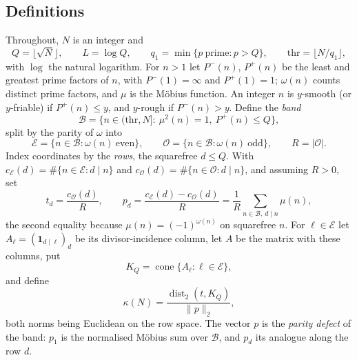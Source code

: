 \documentclass[11pt,a4paper]{article}
\theoremstyle{plain}
\theoremstyle{definition}
\theoremstyle{remark}
\DeclareMathOperator{\dist}{dist}
\DeclareMathOperator{\cone}{cone}
\newcommand{\Pp}{P^{+}}
\newcommand{\Pm}{P^{-}}
\newcommand{\thr}{\mathrm{thr}}
\newcommand{\vB}{\mathcal{E}}
\newcommand{\vR}{\mathcal{O}}
\newcommand{\band}{\mathcal{B}}
\begin{document}
\subsection{Definitions}\label{sec:object}
Throughout, $N$ is an integer and
\begin{equation}\label{eq:param}
  Q=\lfloor\sqrt N\rfloor,\qquad L=\log Q,\qquad
  q_{1}=\min\{p\ \text{prime}:p>Q\},\qquad \thr=\lfloor N/q_{1}\rfloor,
\end{equation}
with $\log$ the natural logarithm. For $n>1$ let $\Pm(n)$, $\Pp(n)$ be the least and greatest prime factors
of $n$, with $\Pm(1)=\infty$ and $\Pp(1)=1$; $\omega(n)$ counts distinct prime factors, and $\mu$ is the
M\"obius function. An integer $n$ is $y$-smooth (or $y$-friable) if $\Pp(n)\le y$, and $y$-rough if $\Pm(n)>y$. Define the \emph{band}
\begin{equation}\label{eq:band}
  \band=\bigl\{n\in(\thr,N]:\ \mu^{2}(n)=1,\ \Pp(n)\le Q\bigr\},
\end{equation}
split by the parity of $\omega$ into
\begin{equation}\label{eq:parts}
  \vB=\{n\in\band:\omega(n)\ \text{even}\},\qquad
  \vR=\{n\in\band:\omega(n)\ \text{odd}\},\qquad R=|\vR|.
\end{equation}
Index coordinates by the \emph{rows}, the squarefree $d\le Q$. With $c_{\vB}(d)=\#\{n\in\vB:d\mid n\}$ and
$c_{\vR}(d)=\#\{n\in\vR:d\mid n\}$, and assuming $R>0$, set
\begin{equation}\label{eq:tp}
  t_{d}=\frac{c_{\vR}(d)}R,\qquad
  p_{d}=\frac{c_{\vB}(d)-c_{\vR}(d)}R=\frac1R\sum_{n\in\band,\ d\mid n}\mu(n),
\end{equation}
the second equality because $\mu(n)=(-1)^{\omega(n)}$ on squarefree $n$. For $\ell\in\vB$ let
$A_{\ell}=(\mathbf1_{d\mid\ell})_{d}$ be its divisor-incidence column, let $A$ be the matrix with these
columns, put
\begin{equation}\label{eq:cone}
  K_{Q}=\cone\{A_{\ell}:\ell\in\vB\},
\end{equation}
and define
\begin{equation}\label{eq:kappa}
  \kappa(N)=\frac{\dist_{2}(t,K_{Q})}{\|p\|_{2}},
\end{equation}
both norms being Euclidean on the row space. The vector $p$ is the \emph{parity defect} of the band:
$p_{1}$ is the normalised M\"obius sum over $\band$, and $p_{d}$ its analogue along the row $d$.
\end{document}
